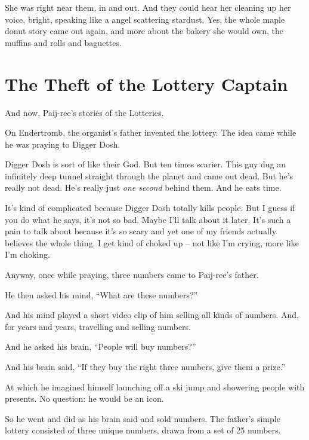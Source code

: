 \documentclass[12pt,twoside]{report}
\begin{document}
She was right near them, in and out.  And they could hear her cleaning
up her voice, bright, speaking like a angel scattering stardust. Yes,
the whole maple donut story came out again, and more about the bakery
she would own, the muffins and rolls and baguettes.

\newpage


\section{The Theft of the Lottery Captain}




And now, Paij-ree's stories of the Lotteries.

On Endertromb, the organist's father invented the lottery.  The idea
came while he was praying to Digger Dosh.

Digger Dosh is sort of like their God.  But ten times scarier.  This
guy dug an infinitely deep tunnel straight through the planet and came
out dead. But he's really not dead.  He's really just {\em one second}
behind them.  And he eats time.

It's kind of complicated because Digger Dosh totally kills people.
But I guess if you do what he says, it's not so bad.  Maybe I'll talk
about it later.  It's such a pain to talk about because it's so scary
and yet one of my friends actually believes the whole thing.  I get
kind of choked up -- not like I'm crying, more like I'm choking.

Anyway, once while praying, three numbers came to Paij-ree's father.

He then asked his mind, ``What are these numbers?''

And his mind played a short video clip of him selling all kinds of
numbers.  And, for years and years, travelling and selling numbers.

And he asked his brain, ``People will buy numbers?''

And his brain said, ``If they buy the right three numbers, give them a
prize.''

At which he imagined himself launching off a ski jump and showering
people with presents.  No question: he would be an icon.

So he went and did as his brain said and sold numbers.  The father's
simple lottery consisted of three unique numbers, drawn from a set of
25 numbers.
\end{document}
